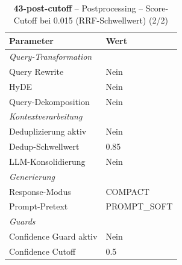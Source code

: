 \begin{table}[H]
\centering
\small
\setlength{\tabcolsep}{4pt}
\begin{tabular}{lp{8cm}}
\toprule
\textbf{Parameter} & \textbf{Wert} \\
\midrule
\multicolumn{2}{l}{\textit{Query-Transformation}} \\
\midrule
\quad Query Rewrite & Nein \\
\quad HyDE & Nein \\
\quad Query-Dekomposition & Nein \\
\midrule
\multicolumn{2}{l}{\textit{Kontextverarbeitung}} \\
\midrule
\quad Deduplizierung aktiv & Nein \\
\quad Dedup-Schwellwert & 0.85 \\
\quad LLM-Konsolidierung & Nein \\
\midrule
\multicolumn{2}{l}{\textit{Generierung}} \\
\midrule
\quad Response-Modus & COMPACT \\
\quad Prompt-Pretext & PROMPT\_SOFT \\
\midrule
\multicolumn{2}{l}{\textit{Guards}} \\
\midrule
\quad Confidence Guard aktiv & Nein \\
\quad Confidence Cutoff & 0.5 \\
\bottomrule
\end{tabular}
\caption{\textbf{43-post-cutoff} -- Postprocessing -- Score-Cutoff bei 0.015 (RRF-Schwellwert) (2/2)}
\label{tab:config_43_post_cutoff_b}
\end{table}
